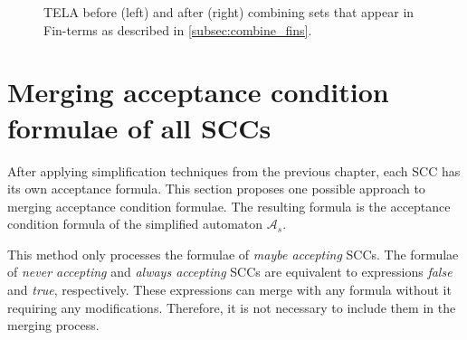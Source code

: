 \documentclass[
  digital, %
  twoside, %
  table,   %
  lof,     %
  lot,     %
]{fithesis3}
\begin{document}
\begin{figure}[h]
  \centering
  \caption{TELA before (left) and after (right) combining sets that appear in Fin-terms as described in \protect \ref{subsec:combine_fins}.}
  \label{fig:combine_fins}
\end{figure}

\section{Merging acceptance condition formulae of all SCCs}
\label{sec:merging_formulae}
After applying simplification techniques from the previous chapter, each SCC has its own acceptance formula. This section proposes one possible approach to merging acceptance condition formulae. The resulting formula is the acceptance condition formula of the simplified automaton $\mathcal{A}_s$.

This method only processes the formulae of \emph{maybe accepting} SCCs. The formulae of \emph{never accepting} and \emph{always accepting} SCCs are equivalent to expressions \emph{false} and \emph{true}, respectively. These expressions can merge with any formula without it requiring any modifications. Therefore, it is not necessary to include them in the merging process. 
\end{document}
